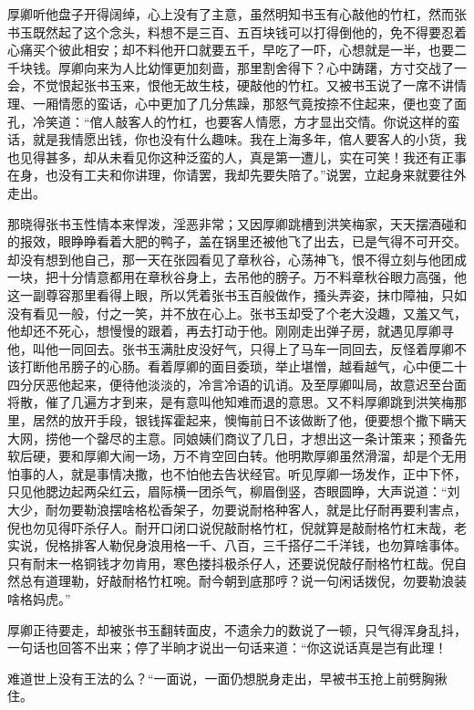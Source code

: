 \documentclass[12pt,UTF8]{ctexbook}
\begin{document}
{{{厚卿听他盘子开得阔绰，心上没有了主意，虽然明知书玉有心敲他的竹杠，然而张书玉既然起了这个念头，料想不是三百、五百块钱可以打得倒他的，免不得要忍着心痛买个彼此相安；却不料他开口就要五千，早吃了一吓，心想就是一半，也要二千块钱。厚卿向来为人比幼惲更加刻啬，那里割舍得下？心中踌躇，方寸交战了一会，不觉恨起张书玉来，恨他无故生枝，硬敲他的竹杠。又被书玉说了一席不讲情理、一厢情愿的蛮话，心中更加了几分焦躁，那怒气竟按捺不住起来，便也变了面孔，冷笑道：“倌人敲客人的竹杠，也要客人情愿，方才显出交情。你说这样的蛮话，就是我情愿出钱，你也没有什么趣味。我在上海多年，倌人要客人的小货，我也见得甚多，却从未看见你这种泛蛮的人，真是第一遭儿，实在可笑！我还有正事在身，也没有工夫和你讲理，你请罢，我却先要失陪了。”说罢，立起身来就要往外走出。

那晓得张书玉性情本来悍泼，淫恶非常；又因厚卿跳槽到洪笑梅家，天天摆酒碰和的报效，眼睁睁看着大肥的鸭子，盖在锅里还被他飞了出去，已是气得不可开交。却没有想到他自己，那一天在张园看见了章秋谷，心荡神飞，恨不得立刻与他团成一块，把十分情意都用在章秋谷身上，去吊他的膀子。万不料章秋谷眼力高强，他这一副尊容那里看得上眼，所以凭着张书玉百般做作，搔头弄姿，抹巾障袖，只如没有看见一般，付之一笑，并不放在心上。张书玉却受了个老大没趣，又羞又气，他却还不死心，想慢慢的跟着，再去打动于他。刚刚走出弹子房，就遇见厚卿寻他，叫他一同回去。张书玉满肚皮没好气，只得上了马车一同回去，反怪着厚卿不该打断他吊膀子的心肠。看着厚卿的面目委琐，举止堪憎，越看越气，心中便二十四分厌恶他起来，便待他淡淡的，冷言冷语的讥诮。及至厚卿叫局，故意迟至台面将散，催了几遍方才到来，是有意叫他知难而退的意思。又不料厚卿跳到洪笑梅那里，居然的放开手段，银钱挥霍起来，懊悔前日不该做断了他，便要想个撒下瞒天大网，捞他一个罄尽的主意。同娘姨们商议了几日，才想出这一条计策来；预备先软后硬，要和厚卿大闹一场，万不肯空回白转。他明欺厚卿虽然滑溜，却是个无用怕事的人，就是事情决撒，也不怕他去告状经官。听见厚卿一场发作，正中下怀，只见他腮边起两朵红云，眉际横一团杀气，柳眉倒竖，杏眼圆睁，大声说道：“刘大少，耐勿要勒浪摆啥格松香架子，勿要说耐格种客人，就是比仔耐再要利害点，倪也勿见得吓杀仔人。耐开口闭口说倪敲耐格竹杠，倪就算是敲耐格竹杠末哉，老实说，倪格排客人勒倪身浪用格一千、八百，三千搭仔二千洋钱，也勿算啥事体。只有耐末一格铜钱才勿肯用，寒色搂抖极杀仔人，还要说倪敲仔耐格竹杠哉。倪自然总有道理勒，好敲耐格竹杠啘。耐今朝到底那哼？说一句闲话拨倪，勿要勒浪装啥格妈虎。”

厚卿正待要走，却被张书玉翻转面皮，不遗余力的数说了一顿，只气得浑身乱抖，一句话也回答不出来；停了半晌才说出一句话来道：“你这说话真是岂有此理！

难道世上没有王法的么？“一面说，一面仍想脱身走出，早被书玉抢上前劈胸揪住。

}}}
\end{document}

